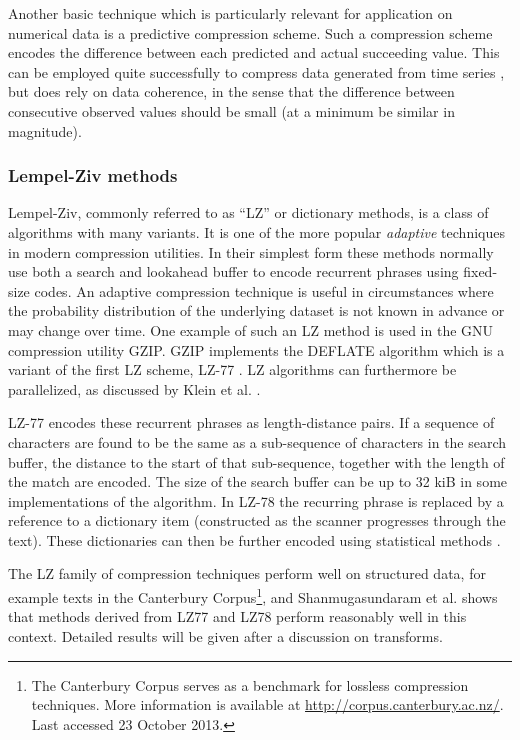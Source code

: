 Another basic technique which is particularly relevant for application on numerical data is a predictive compression scheme. Such a compression scheme encodes the 
difference between each predicted and actual succeeding value. This can be employed quite successfully to compress data generated from time series \cite{engelson2000lossless}, 
but does rely on data coherence, in the sense that the difference between consecutive observed values should be small (at a minimum be similar in magnitude). 
\subsubsection{Lempel-Ziv methods}
Lempel-Ziv, commonly referred to as “LZ” or dictionary methods, is a class of algorithms with many variants. It is one of the more popular \textit{adaptive} techniques 
in modern compression utilities. In their simplest form these methods normally use both a search and lookahead buffer to encode recurrent phrases using fixed-size codes. An 
adaptive compression technique is useful in circumstances where the probability distribution of the underlying dataset is not known in advance or may change over time. 
One example of such an LZ method is used in the GNU compression utility GZIP. GZIP implements the DEFLATE algorithm which is a variant of the first LZ scheme, LZ-77 
\cite[ch. 3]{salomon2004data}. LZ algorithms can furthermore be parallelized, as discussed by Klein et al. \cite{klein2005parallel}. 

LZ-77 encodes these recurrent phrases as length-distance pairs. If a sequence of characters are found to be the same as a sub-sequence of characters in the search buffer, the 
distance to the start of that sub-sequence, together with the length of the match are encoded. The size of the search buffer can be up to 32 kiB in some implementations of the 
algorithm. In LZ-78 the recurring phrase is replaced by a reference to a dictionary item (constructed as the scanner progresses through the text). These dictionaries
can then be further encoded using statistical methods \cite[ch. 3]{salomon2004data}.

The LZ family of compression techniques perform well on structured data, for example texts in the Canterbury Corpus\footnote{The Canterbury Corpus serves as a benchmark
for lossless compression techniques. More information is available at \url{http://corpus.canterbury.ac.nz/}. Last accessed 23 October 2013.}, and Shanmugasundaram et al.
\cite{shanmugasundaram2011comparative} shows that methods derived from LZ77 and LZ78 perform reasonably well in this context. Detailed results will be given after a discussion
on transforms.
